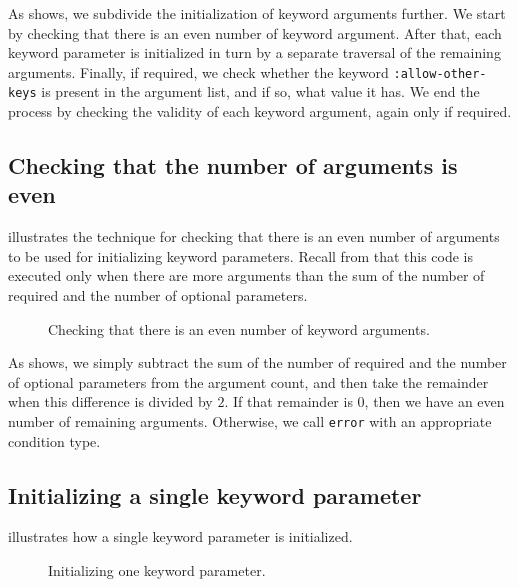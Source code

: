 As  shows, we subdivide the
initialization of keyword arguments further.  We start by checking
that there is an even number of keyword argument.  After that, each
keyword parameter is initialized in turn by a separate traversal of
the remaining arguments.  Finally, if required, we check whether the
keyword \texttt{:allow-other-keys} is present in the argument list,
and if so, what value it has.  We end the process by checking the
validity of each keyword argument, again only if required.

\subsection{Checking that the number of arguments is even}

 illustrates the technique
for checking that there is an even number of arguments to be used for
initializing keyword parameters.  Recall from
 that this code is executed only when
there are more arguments than the sum of the number of required and
the number of optional parameters.

\begin{figure}
\begin{center}
\end{center}
\caption{\label{fig-check-even-keyword-arguments}
Checking that there is an even number of keyword arguments.}
\end{figure}

As  shows, we simply subtract
the sum of the number of required and the number of optional
parameters from the argument count, and then take the remainder when
this difference is divided by $2$.  If that remainder is 0, then we
have an even number of remaining arguments.  Otherwise, we call
\texttt{error} with an appropriate condition type.

\subsection{Initializing a single keyword parameter}

 illustrates how a single
keyword parameter is initialized.

\begin{figure}
\begin{center}
\end{center}
\caption{\label{fig-initialize-one-keyword-parameter}
Initializing one keyword parameter.}
\end{figure}

